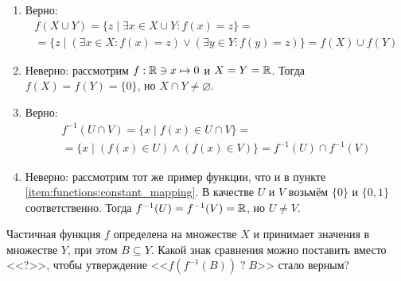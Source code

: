 \begin{Answer}
    \noindent
    \begin{enumerate}[label=\textbf{\alph*)}]
        \item
            Верно:
            \begin{multline*}
                f(X \cup Y) = \{ z \mid \exists x \in X \cup Y: f(x) = z \} = \\
                = \{z \mid \left(\exists x \in X: f(x) = z \right) \vee \left( \exists y \in Y: f(y) = z \right) \} = f(X) \cup f(Y)
            \end{multline*}
        \item
            \label{item:functions:constant_mapping}
            Неверно: рассмотрим $ f: \mathbb{R} \ni x \mapsto 0 $ и $ X = Y = \mathbb{R} $.
            Тогда $ f(X) = f(Y) = \{ 0 \} $, но $ X \cap Y \neq \varnothing $.
        \item
            Верно:
            \begin{multline*}
                f^{-1}(U \cap V) = \{ x \mid f(x) \in U \cap V \} = \\
                = \{x \mid (f(x) \in U) \wedge (f(x) \in V) \} = f^{-1}(U) \cap f^{-1}(V)
            \end{multline*}
        \item
            Неверно: рассмотрим тот же пример функции, что и в пункте \ref{item:functions:constant_mapping}.
            В качестве $ U $ и $ V $ возьмём $ \{0\} $ и $ \{0, 1\} $ соответственно.
            Тогда $ f^{-1}(U) = f^{-1}(V) = \mathbb{R} $, но $ U \neq V $.
    \end{enumerate}
\end{Answer}


\begin{Exercise}[counter=SecExercise, label={exercise:functions:map_unmap}]
    \noindent
    Частичная функция $ f $ определена на множестве $ X $ и принимает
    значения в множестве $ Y $, при этом $ B \subseteq Y $.
    Какой знак сравнения можно поставить вместо <<?>>, чтобы утверждение <<$ f (f^{-1}(B)) \; ? \; B $>> стало верным?
\end{Exercise}


